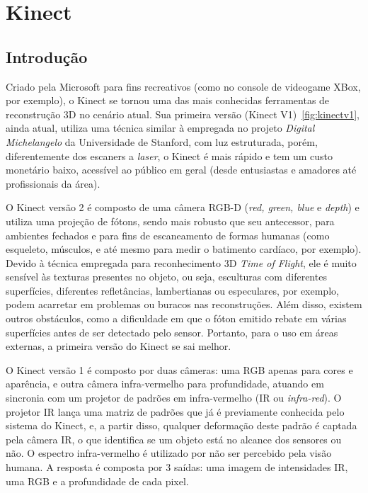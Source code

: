 \section{Kinect}

\subsection*{Introdução}

Criado pela Microsoft para fins recreativos (como no console de videogame XBox, por
exemplo), o Kinect se tornou uma das mais conhecidas ferramentas de reconstrução 3D no
cenário atual. Sua primeira versão (Kinect V1)~\ref{fig:kinectv1}, ainda atual, utiliza uma
técnica similar à empregada no projeto \emph{Digital Michelangelo} da Universidade de Stanford, com luz
estruturada, porém, diferentemente dos escaners a \emph{laser}, o Kinect é mais rápido e tem um
custo monetário baixo, acessível ao público em geral (desde entusiastas
e amadores até profissionais da área). 

O Kinect versão 2 é composto de uma câmera RGB-D (\emph{red, green, blue} e
\emph{depth}) e utiliza uma projeção de fótons, sendo mais robusto que seu
antecessor, para ambientes fechados e para fins de escaneamento de formas
humanas (como esqueleto, músculos, e até mesmo para medir o batimento cardíaco, por exemplo). Devido à
técnica empregada para reconhecimento 3D \emph{Time of Flight},
ele é muito sensível às texturas presentes no objeto, ou seja, esculturas
com diferentes superfícies, diferentes refletâncias, lambertianas ou
especulares, por exemplo, podem acarretar em problemas ou buracos nas reconstruções. Além
disso, existem outros obstáculos, como a dificuldade em que o fóton emitido 
rebate em várias superfícies antes de ser detectado pelo sensor. 
Portanto, para o uso em áreas externas, a primeira versão do Kinect se sai melhor.

O Kinect versão 1 é composto por duas câmeras: uma RGB apenas para cores e aparência,
e outra câmera infra-vermelho para profundidade, atuando em sincronia com um projetor de padrões em infra-vermelho (IR ou \emph{infra-red}). O projetor IR lança uma matriz de padrões que já é previamente
conhecida pelo sistema do Kinect, e, a partir disso, qualquer deformação deste
padrão é captada pela câmera IR, o que identifica se um objeto está no alcance
dos sensores ou não. O espectro infra-vermelho é utilizado por não ser percebido pela visão humana.
A resposta é composta por 3 saídas: uma imagem de intensidades IR, uma RGB e a profundidade de cada pixel. 

